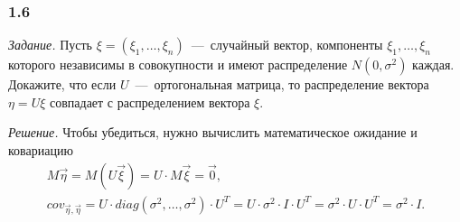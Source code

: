 \subsubsection*{1.6}

\textit{Задание.}
Пусть $ \xi = \left( \xi_1, \dotsc, \xi_n \right) $~---~случайный вектор,
компоненты $ \xi_1, \dotsc, \xi_n$
которого независимы в совокупности и имеют распределение
$N \left( 0, \sigma^2 \right) $ каждая.
Докажите, что если $U$~---~ортогональная матрица,
то распределение вектора $ \eta = U \xi $ совпадает с распределением вектора
$ \xi $.

\textit{Решение.}
Чтобы убедиться, нужно вычислить математическое ожидание и ковариацию
\begin{gather*}
  M \vec{ \eta } =
  M \left( U \vec{ \xi } \right) =
  U \cdot M \vec{ \xi } =
  \vec{0}, \\
  cov_{ \vec{ \eta }, \vec{ \eta }} =
  U \cdot diag \left( \sigma^2, \dotsc, \sigma^2 \right) \cdot U^T =
  U \cdot \sigma^2 \cdot I \cdot U^T =
  \sigma^2 \cdot U \cdot U^T =
  \sigma^2 \cdot I.
\end{gather*}
